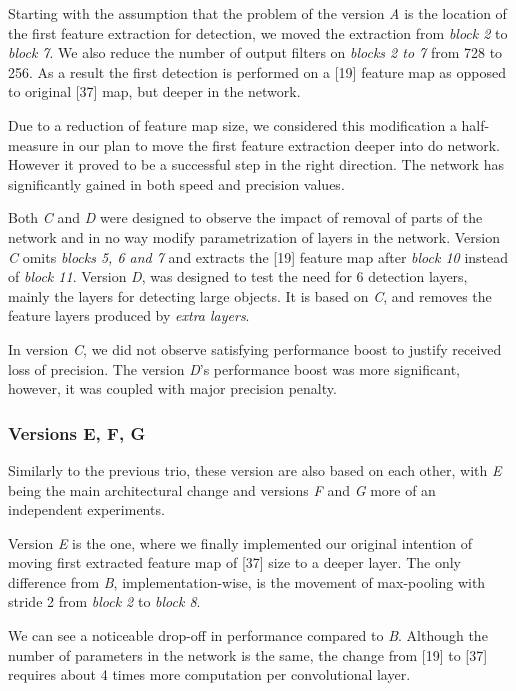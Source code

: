 Starting with the assumption that the problem of the version \textit{A} is the location of the first feature extraction for detection, we moved the extraction from \textit{block 2} to \textit{block 7}. We also reduce the number of output filters on \textit{blocks 2 to 7} from 728 to 256. As a result the first detection is performed on a [19] feature map as opposed to original [37] map, but deeper in the network. 

Due to a reduction of feature map size, we considered this modification a half-measure in our plan to move the first feature extraction deeper into do network. However it proved to be a successful step in the right direction. The network has significantly gained in both speed and precision values. 

Both \textit{C} and \textit{D} were designed to observe the impact of removal of parts of the network and in no way modify parametrization of layers in the network. Version \textit{C} omits \textit{blocks 5, 6 and 7} and extracts the [19] feature map after \textit{block 10} instead of \textit{block 11}. Version \textit{D}, was designed to test the need for 6 detection layers, mainly the layers for detecting large objects. It is based on \textit{C}, and removes the feature layers produced by \textit{extra layers}.

In version \textit{C}, we did not observe satisfying performance boost to justify received loss of precision. The version \textit{D}'s performance boost was more significant, however, it was coupled with major precision penalty.

\subsubsection{Versions E, F, G}
Similarly to the previous trio, these version are also based on each other, with \textit{E} being the main architectural change and versions \textit{F} and \textit{G} more of an independent experiments. 

Version \textit{E} is the one, where we finally implemented our original intention of moving first extracted feature map of [37] size to a deeper layer. The only difference from \textit{B}, implementation-wise, is the movement of max-pooling with stride 2 from \textit{block 2} to \textit{block 8}. 

We can see a noticeable drop-off in performance compared to \textit{B}. Although the number of parameters in the network is the same, the change from [19] to [37] requires about 4 times more computation per convolutional layer. 


